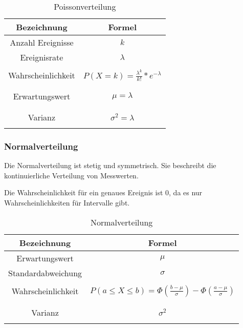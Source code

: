\documentclass[12pt]{scrartcl}
\begin{document}
\begin{table}[h]
    \begin{tabular}{ | c | c | }
        \hline
        Bezeichnung        & Formel                                         \\
        \hline
        Anzahl Ereignisse  & $k$                                            \\
        Ereignisrate       & $\lambda$                                      \\

        \hline             &                                                \\
        Wahrscheinlichkeit & $P(X=k) = \frac{\lambda^k}{k!} * e^{-\lambda}$ \\&\\&\\
        Erwartungswert     & $\mu = \lambda$                                \\&\\&\\
        Varianz            & $\sigma^2 = \lambda$                           \\&\\
        \hline
    \end{tabular}
    \caption{Poissonverteilung}
\end{table}

\subsubsection{Normalverteilung}

Die Normalverteilung ist stetig und symmetrisch.
Sie beschreibt die kontinuierliche Verteilung von Messwerten.\par
Die Wahrscheinlichkeit für ein genaues Ereignis ist 0,
da es nur Wahrscheinlichkeiten für Intervalle gibt.

\begin{table}[h]
    \begin{tabular}{ | c | c | }
        \hline
        Bezeichnung        & Formel                                                                         \\
        \hline
        Erwartungswert     & $\mu$                                                                          \\
        Standardabweichung & $\sigma$                                                                       \\
        \hline             &                                                                                \\
        Wahrscheinlichkeit & $P(a \leq X \leq b) = \Phi(\frac{b-\mu}{\sigma}) - \Phi(\frac{a-\mu}{\sigma})$ \\&\\&\\
        Varianz            & $\sigma^2$                                                                     \\&\\
        \hline
    \end{tabular}
    \caption{Normalverteilung}
\end{table}
\end{document}
